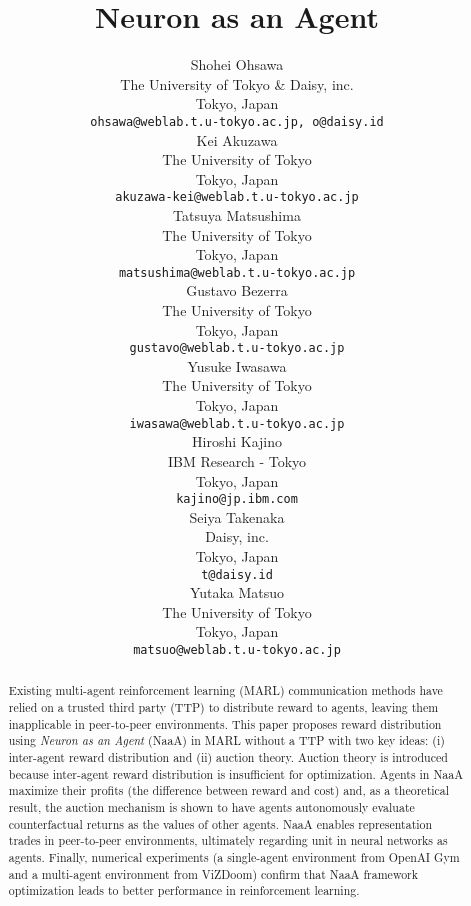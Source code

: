 \documentclass{article} %
\title{Neuron as an Agent}
\author{Shohei Ohsawa \\
The University of Tokyo \& Daisy, inc.\\
Tokyo, Japan \\
\texttt{ohsawa@weblab.t.u-tokyo.ac.jp, o@daisy.id} \\
\AND
Kei Akuzawa \\
The University of Tokyo \\
Tokyo, Japan \\
\texttt{akuzawa-kei@weblab.t.u-tokyo.ac.jp} \\
\AND
Tatsuya Matsushima \\
The University of Tokyo \\
Tokyo, Japan \\
\texttt{matsushima@weblab.t.u-tokyo.ac.jp} \\
\AND
Gustavo Bezerra \\
The University of Tokyo \\
Tokyo, Japan \\
\texttt{gustavo@weblab.t.u-tokyo.ac.jp} \\
\AND
Yusuke Iwasawa \\
The University of Tokyo \\
Tokyo, Japan \\
\texttt{iwasawa@weblab.t.u-tokyo.ac.jp} \\
\AND
Hiroshi Kajino \\
IBM Research - Tokyo \\
Tokyo, Japan \\
\texttt{kajino@jp.ibm.com} \\
\AND
Seiya Takenaka \\
Daisy, inc. \\
Tokyo, Japan \\
\texttt{t@daisy.id} \\
\AND
Yutaka Matsuo \\
The University of Tokyo \\
Tokyo, Japan \\
\texttt{matsuo@weblab.t.u-tokyo.ac.jp} \\
}
\begin{document}
\maketitle

\begin{abstract}
Existing multi-agent reinforcement learning (MARL) communication methods have relied on a trusted third party (TTP) to distribute reward to agents, leaving them inapplicable in peer-to-peer environments. This paper proposes reward distribution using {\em Neuron as an Agent} (NaaA) in MARL without a TTP with two key ideas: (i) inter-agent reward distribution and (ii) auction theory. Auction theory is introduced because inter-agent reward distribution is insufficient for optimization. Agents in NaaA maximize their profits (the difference between reward and cost) and, as a theoretical result, the auction mechanism is shown to have agents autonomously evaluate counterfactual returns as the values of other agents. NaaA enables representation trades in peer-to-peer environments, ultimately regarding unit in neural networks as agents. Finally, numerical experiments (a single-agent environment from OpenAI Gym and a multi-agent environment from ViZDoom) confirm that NaaA framework optimization leads to better performance in reinforcement learning.
\end{abstract}











\end{document}
